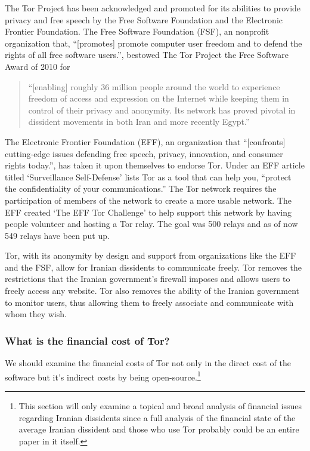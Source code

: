 \documentclass[11pt]{article}
\begin{document}
\begin{multicols}{2}
The Tor Project has been acknowledged and promoted for its abilities to provide
privacy and free speech by the Free Software Foundation and the Electronic
Frontier Foundation.
The Free Software Foundation (FSF), an nonprofit organization that, ``[promotes]
promote computer user freedom and to defend the rights of all free software
users.''\cite{FSF:About}, bestowed The Tor Project the Free Software Award of 2010
for
\begin{quotation}
  ``[enabling] roughly 36 million people around the world to
  experience freedom of access and expression on the Internet while keeping them
  in control of their privacy and anonymity. Its network has proved pivotal in
  dissident movements in both Iran and more recently
  Egypt.''\cite{FreeSoftwareAwards} 
\end{quotation}
The Electronic Frontier Foundation (EFF), an organization that ``[confronts]
cutting-edge issues defending free speech, privacy, innovation, and consumer
rights today.''\cite{EFF:About}, has taken it upon themselves to endorse Tor.
Under an EFF article titled `Surveillance Self-Defense' lists Tor as a tool that
can help you, ``protect the confidentiality of your
communications.''\cite{EFF:Tor} The Tor network requires the participation of
members of the network to create a more usable network. The EFF created `The EFF
Tor Challenge' to help support this network by having people volunteer and
hosting a Tor relay.\cite{EFF:TorChallenge} The goal was 500 relays and as of
now 549 relays have been put up.\cite{EFF:TorChallenge}

Tor, with its anonymity by design and support from organizations like the EFF
and the FSF, allow for Iranian dissidents to communicate freely. Tor removes the restrictions
that the Iranian government's firewall imposes and allows users to freely access
any website. Tor also removes the ability of the Iranian government to monitor
users, thus allowing them to freely associate and communicate with whom they
wish. 

\subsubsection{What is the financial cost of Tor?}

We should examine the financial costs of Tor not only in the direct cost of the
software but it's indirect costs by being open-source.\footnote{This section
  will only examine a topical and broad analysis of financial issues regarding
  Iranian dissidents since a full analysis of the financial state of the average
Iranian dissident and those who use Tor probably could be an entire paper in it
itself.}


\end{multicols}
\end{document}
